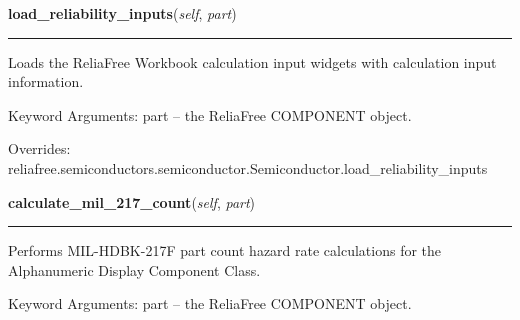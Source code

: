     \vspace{0.5ex}

\hspace{.8\funcindent}\begin{boxedminipage}{\funcwidth}

    \raggedright \textbf{load\_reliability\_inputs}(\textit{self}, \textit{part})

    \vspace{-1.5ex}

    \rule{\textwidth}{0.5\fboxrule}
\setlength{\parskip}{2ex}
    Loads the ReliaFree Workbook calculation input widgets with calculation
    input information.

    Keyword Arguments: part -- the ReliaFree COMPONENT object.

\setlength{\parskip}{1ex}
      Overrides: reliafree.semiconductors.semiconductor.Semiconductor.load\_reliability\_inputs

    \end{boxedminipage}

    \label{reliafree:semiconductors:optoelectronics:Display:calculate_mil_217_count}

    \vspace{0.5ex}

\hspace{.8\funcindent}\begin{boxedminipage}{\funcwidth}

    \raggedright \textbf{calculate\_mil\_217\_count}(\textit{self}, \textit{part})

    \vspace{-1.5ex}

    \rule{\textwidth}{0.5\fboxrule}
\setlength{\parskip}{2ex}
    Performs MIL-HDBK-217F part count hazard rate calculations for the 
    Alphanumeric Display Component Class.

    Keyword Arguments: part -- the ReliaFree COMPONENT object.

\setlength{\parskip}{1ex}
    \end{boxedminipage}

    \label{reliafree:semiconductors:optoelectronics:Display:calculate_mil_217_stress}

